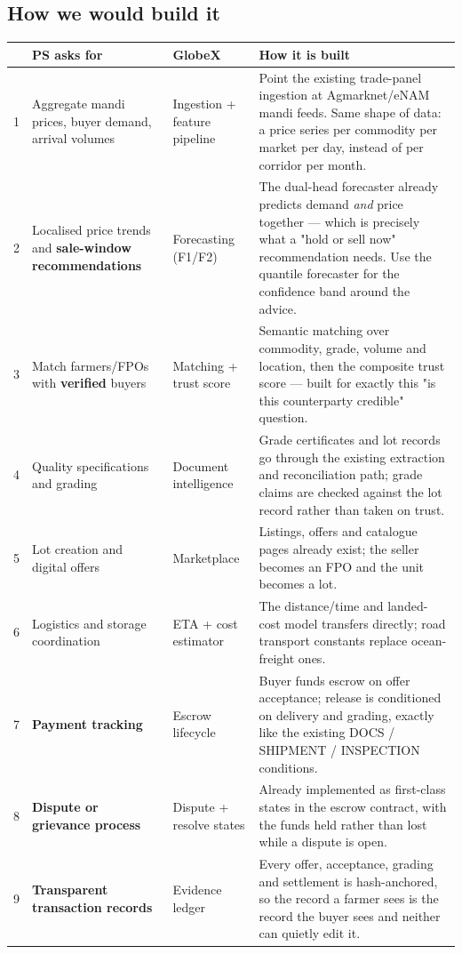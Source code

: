 \documentclass[11pt]{article}
\begin{document}
\subsection*{How we would build it}
\renewcommand{\arraystretch}{1.35}
\noindent\begin{longtable}{@{}p{0.5cm}p{4.5cm}p{2.0cm}p{8.6cm}@{}}
\toprule
& \textbf{PS asks for} & \textbf{GlobeX} & \textbf{How it is built} \\
\midrule
\endhead
1 & Aggregate mandi prices, buyer demand, arrival volumes & Ingestion + feature pipeline & Point the existing trade-panel ingestion at Agmarknet/eNAM mandi feeds. Same shape of data: a price series per commodity per market per day, instead of per corridor per month. \\
2 & Localised price trends and \textbf{sale-window recommendations} & Forecasting (F1/F2) & The dual-head forecaster already predicts demand \emph{and} price together --- which is precisely what a "hold or sell now" recommendation needs. Use the quantile forecaster for the confidence band around the advice. \\
3 & Match farmers/FPOs with \textbf{verified} buyers & Matching + trust score & Semantic matching over commodity, grade, volume and location, then the composite trust score --- built for exactly this "is this counterparty credible" question. \\
4 & Quality specifications and grading & Document intelligence & Grade certificates and lot records go through the existing extraction and reconciliation path; grade claims are checked against the lot record rather than taken on trust. \\
5 & Lot creation and digital offers & Marketplace & Listings, offers and catalogue pages already exist; the seller becomes an FPO and the unit becomes a lot. \\
6 & Logistics and storage coordination & ETA + cost estimator & The distance/time and landed-cost model transfers directly; road transport constants replace ocean-freight ones. \\
7 & \textbf{Payment tracking} & Escrow lifecycle & Buyer funds escrow on offer acceptance; release is conditioned on delivery and grading, exactly like the existing DOCS / SHIPMENT / INSPECTION conditions. \\
8 & \textbf{Dispute or grievance process} & Dispute + resolve states & Already implemented as first-class states in the escrow contract, with the funds held rather than lost while a dispute is open. \\
9 & \textbf{Transparent transaction records} & Evidence ledger & Every offer, acceptance, grading and settlement is hash-anchored, so the record a farmer sees is the record the buyer sees and neither can quietly edit it. \\
\bottomrule
\end{longtable}
\end{document}
